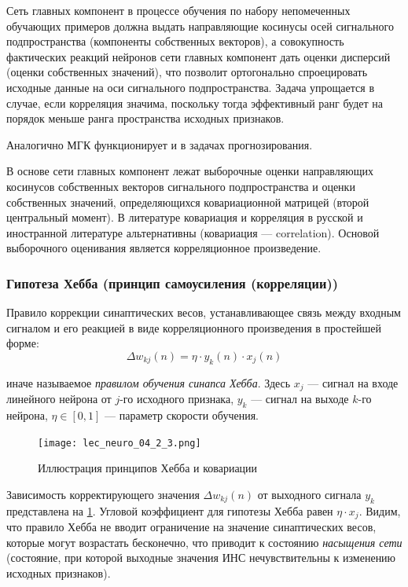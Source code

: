 \documentclass{article}
\numberwithin{equation}{subsection}
\begin{document}
Сеть главных компонент в процессе обучения по набору непомеченных обучающих примеров
должна выдать направляющие косинусы осей сигнального подпространства (компоненты собственных
векторов), а совокупность фактических реакций нейронов сети главных компонент дать оценки 
дисперсий (оценки собственных значений), что позволит ортогонально спроецировать исходные
данные на оси сигнального подпространства. 
Задача упрощается в случае, если корреляция значима, поскольку тогда эффективный ранг 
будет на порядок меньше ранга пространства исходных признаков.

Аналогично МГК функционирует и в задачах прогнозирования.

В основе сети главных компонент лежат выборочные оценки направляющих косинусов собственных
векторов сигнального подпространства и оценки собственных значений, определяющихся
ковариационной матрицей (второй центральный момент). В литературе ковариация и корреляция
в русской и иностранной литературе альтернативны (ковариация --- correlation).
Основой выборочного оценивания является корреляционное произведение.




\subsubsection{Гипотеза Хебба (принцип самоусиления (корреляции))}

Правило коррекции синаптических весов, устанавливающее связь между входным сигналом
и его реакцией в виде корреляционного произведения в простейшей форме:
\begin{equation}
    \Delta w_{kj} (n) = \eta \cdot y_k(n) \cdot x_j(n)
\end{equation}

\noindent
иначе называемое \textit{правилом обучения синапса Хебба}. 
Здесь $x_j$ --- сигнал на входе линейного нейрона от $j$-го исходного признака, $y_k$ --- 
сигнал на выходе $k$-го нейрона, $\eta \in \left[0, 1\right]$ --- параметр скорости
обучения.

\begin{figure}[htbp]
    \centering
    \texttt{[image: lec\_neuro\_04\_2\_3.png]}
    \caption{Иллюстрация принципов Хебба и ковариации}
    \label{lec_neuro_04_2_3}
\end{figure}

Зависимость корректирующего значения $\Delta w_{kj} (n)$ от выходного сигнала $y_k$
представлена на \ref{lec_neuro_04_2_3}. Угловой коэффициент для гипотезы Хебба равен
$\eta \cdot x_j$.
Видим, что правило Хебба не вводит ограничение на значение синаптических весов, которые могут 
возрастать бесконечно, что приводит к состоянию \textit{насыщения сети} 
(состояние, при которой выходные значения ИНС нечувствительны к изменению исходных признаков).
\end{document}
